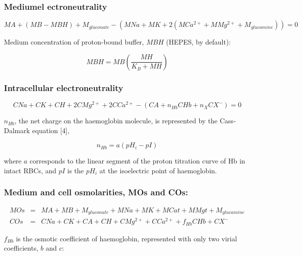 \documentclass[a4paper]{article}
\newcommand{\med}[1]{M#1}
\newcommand{\cell}[1]{C#1}
\newcommand{\MA}{\med{A}}
\newcommand{\MB}{\med{B}}
\newcommand{\MBH}{\med{BH}}
\newcommand{\MGluca}{M_{glucamine}}
\newcommand{\MNa}{\med{Na}}
\newcommand{\MK}{\med{K}}
\newcommand{\MCatp}{\med{Ca^{2+}}}
\newcommand{\MMgtp}{\med{Mg^{2+}}}
\newcommand{\MGluco}{M_{gluconate}}
\newcommand{\MH}{\med{H}}
\newcommand{\MOs}{\med{Os}}
\newcommand{\MCat}{\med{Cat}}
\newcommand{\MMgt}{\med{Mgt}}
\newcommand{\KB}{K_B}
\newcommand{\CNa}{\cell{Na}}
\newcommand{\CK}{\cell{K}}
\newcommand{\CH}{\cell{H}}
\newcommand{\CMgtp}{\cell{Mg^{2+}}}
\newcommand{\CCatp}{\cell{Ca^{2+}}}
\newcommand{\CA}{\cell{A}}
\newcommand{\nHb}{n_{Hb}}
\newcommand{\CHb}{\cell{Hb}}
\newcommand{\nX}{n_{X}}
\newcommand{\CXm}{\cell{X^{-}}}
\newcommand{\COs}{\cell{Os}}
\newcommand{\pH}[1]{pH_{#1}}
\newcommand{\pI}{pI}
\newcommand{\fHb}{f_{Hb}}
\begin{document}
\subsubsection{Mediumel ectroneutrality}\label{medium-electroneutrality}

\begin{equation}
\MA + (\MB - \MBH) + \MGluco-(\MNa + \MK + 2(\MCatp + \MMgtp + \MGluca)) = 0 \tag{1}
\end{equation}

Medium concentration of proton-bound buffer, $\MBH$ (HEPES, by default):

\setcounter{equation}{1}

\begin{equation}
\MBH = \MB\left(\frac{\MH}{\KB + \MH}\right)
\end{equation}

\subsubsection{Intracellular electroneutrality}

\begin{equation}
\CNa + \CK + \CH + 2\CMgtp + 2\CCatp - (\CA + \nHb\CHb + \nX\CXm) = 0
\end{equation}

$\nHb$, the net charge on the haemoglobin molecule, is represented by the Cass-Dalmark equation [4],

\begin{equation}
\nHb=  a(\pH{i} - \pI)
\end{equation}

where $a$ corresponds to the linear segment of the proton titration curve of Hb in intact RBCs, and $\pI$ is the $\pH{i}$ at the isoelectric point of haemoglobin.

\subsubsection{Medium and cell osmolarities, MOs and COs:}

\begin{eqnarray}
	\MOs &=& \MA + \MB + \MGluco + \MNa + \MK + \MCat + \MMgt + \MGluca\\
	\COs &=& \CNa + \CK + \CA + \CH + \CMgtp + \CCatp  + \fHb\CHb + \CXm
\end{eqnarray}

$\fHb$ is the osmotic coefficient of haemoglobin, represented with only two virial coefficients, $b$ and $c$:
\end{document}
